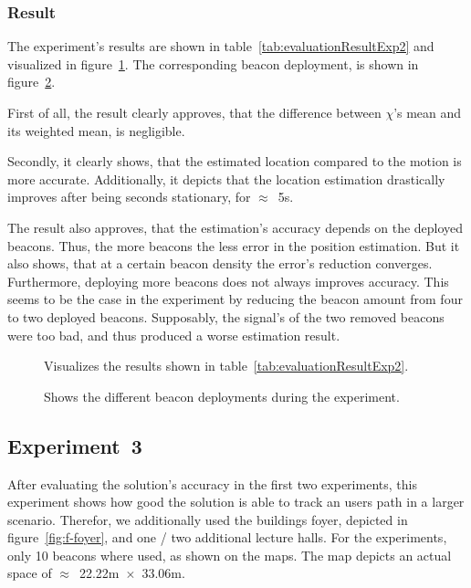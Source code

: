 \subsubsection*{Result}
The experiment's results are shown in table~\ref{tab:evaluationResultExp2} and visualized in figure~\ref{fig:exp2_visualization}. The corresponding beacon deployment, is shown in figure~\ref{fig:exp2_imgs}.

First of all, the result clearly approves, that the difference between $\chi$'s mean and its weighted mean, is negligible.

Secondly, it clearly shows, that the estimated location compared to the motion is more accurate. Additionally, it depicts that the location estimation drastically improves after being seconds stationary, for $\approx$~5s.

The result also approves, that the estimation's accuracy depends on the deployed beacons. Thus, the more beacons the less error in the position estimation. But it also shows, that at a certain beacon density the error's reduction converges. Furthermore, deploying more beacons does not always improves accuracy. This seems to be the case in the experiment by reducing the beacon amount from four to two deployed beacons. Supposably, the signal's of the two removed beacons were too bad, and thus produced a worse estimation result.

\begin{table}
	
	\caption{Depicts the results of experiment~2.}
	\label{tab:evaluationResultExp2}
\end{table}

\begin{figure}
	
	\caption{Visualizes the results shown in table~\ref{tab:evaluationResultExp2}.}
	\label{fig:exp2_visualization}
\end{figure}


\begin{figure}
	
	\caption{Shows the different beacon deployments during the experiment.}
	\label{fig:exp2_imgs}
\end{figure}


\subsection*{Experiment~3}
After evaluating the solution's accuracy in the first two experiments, this experiment shows how good the solution is able to track an users path in a larger scenario. Therefor, we additionally used the buildings foyer, depicted in figure~\ref{fig:f-foyer}, and one / two additional lecture halls. For the experiments, only 10 beacons where used, as shown on the maps. The map depicts an actual space of $\approx$~22.22m~$\times$~33.06m.

